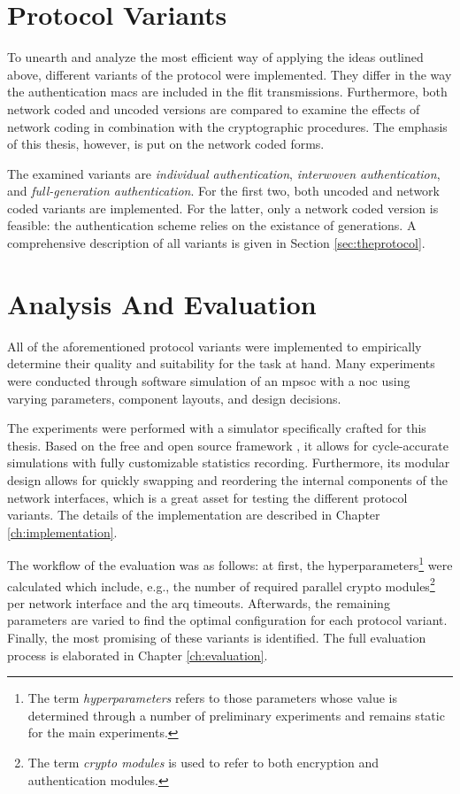 \section{Protocol Variants}\label{sec:protocolvariants}
To unearth and analyze the most efficient way of applying the ideas outlined above, different variants of the protocol were implemented. They differ
in the way the authentication \glspl{mac} are included in the flit transmissions. Furthermore, both network coded and uncoded versions are compared to
examine the effects of network coding in combination with the cryptographic procedures. The emphasis of this thesis, however, is put on the network
coded forms.

The examined variants are \textit{individual authentication}, \textit{interwoven authentication}, and \textit{full-generation authentication}. For the
first two, both uncoded and network coded variants are implemented. For the latter, only a network coded version is feasible: the authentication
scheme relies on the existance of generations. A comprehensive description of all variants is given in Section
\ref{sec:theprotocol}. %

\section{Analysis And Evaluation}
All of the aforementioned protocol variants were implemented to empirically determine their quality and suitability for the task at hand. Many
experiments were conducted through software simulation of an \gls{mpsoc} with a \gls{noc} using varying parameters, component layouts, and design
decisions.

The experiments were performed with a simulator specifically crafted for this thesis. Based on the free and open source framework \textit{\omnet{}}
\cite{omnet}, it allows for cycle-accurate simulations with fully customizable statistics recording. Furthermore, its modular design allows for
quickly swapping and reordering the internal components of the network interfaces, which is a great asset for testing the different protocol variants.
The details of the implementation are described in Chapter \ref{ch:implementation}.

The workflow of the evaluation was as follows: at first, the hyperparameters\footnote{The term \textit{hyperparameters} refers to those parameters
whose value is determined through a number of preliminary experiments and remains static for the main experiments.} were
calculated which include, e.g., the number of required parallel crypto modules\footnote{The term \textit{crypto modules} is
used to refer to both encryption and authentication modules.} per network interface and the \gls{arq} timeouts. Afterwards, the remaining parameters are
varied to find the optimal configuration for each protocol variant. Finally, the most promising of these variants is identified. The full evaluation
process is elaborated in Chapter \ref{ch:evaluation}.
